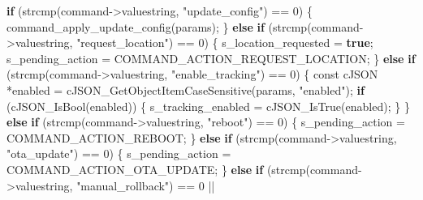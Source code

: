 \documentclass[13pt,a4paper]{extarticle}
\newenvironment{Shaded}{}{}
\newcommand{\ControlFlowTok}[1]{\textcolor[rgb]{0.00,0.44,0.13}{\textbf{#1}}}
\newcommand{\DataTypeTok}[1]{\textcolor[rgb]{0.56,0.13,0.00}{#1}}
\newcommand{\DecValTok}[1]{\textcolor[rgb]{0.25,0.63,0.44}{#1}}
\newcommand{\KeywordTok}[1]{\textcolor[rgb]{0.00,0.44,0.13}{\textbf{#1}}}
\newcommand{\NormalTok}[1]{#1}
\newcommand{\OperatorTok}[1]{\textcolor[rgb]{0.40,0.40,0.40}{#1}}
\newcommand{\StringTok}[1]{\textcolor[rgb]{0.25,0.44,0.63}{#1}}
\renewcommand{\\}{\thesislongtableorignewline\hline}%
\begin{document}
\begin{Shaded}
\begin{Highlighting}[]
    \ControlFlowTok{if} \OperatorTok{(}\NormalTok{strcmp}\OperatorTok{(}\NormalTok{command}\OperatorTok{{-}\textgreater{}}\NormalTok{valuestring}\OperatorTok{,} \StringTok{"update\_config"}\OperatorTok{)} \OperatorTok{==} \DecValTok{0}\OperatorTok{)} \OperatorTok{\{}
\NormalTok{        command\_apply\_update\_config}\OperatorTok{(}\NormalTok{params}\OperatorTok{);}
    \OperatorTok{\}} \ControlFlowTok{else} \ControlFlowTok{if} \OperatorTok{(}\NormalTok{strcmp}\OperatorTok{(}\NormalTok{command}\OperatorTok{{-}\textgreater{}}\NormalTok{valuestring}\OperatorTok{,} \StringTok{"request\_location"}\OperatorTok{)} \OperatorTok{==} \DecValTok{0}\OperatorTok{)} \OperatorTok{\{}
\NormalTok{        s\_location\_requested }\OperatorTok{=} \KeywordTok{true}\OperatorTok{;}
\NormalTok{        s\_pending\_action }\OperatorTok{=}\NormalTok{ COMMAND\_ACTION\_REQUEST\_LOCATION}\OperatorTok{;}
    \OperatorTok{\}} \ControlFlowTok{else} \ControlFlowTok{if} \OperatorTok{(}\NormalTok{strcmp}\OperatorTok{(}\NormalTok{command}\OperatorTok{{-}\textgreater{}}\NormalTok{valuestring}\OperatorTok{,} \StringTok{"enable\_tracking"}\OperatorTok{)} \OperatorTok{==} \DecValTok{0}\OperatorTok{)} \OperatorTok{\{}
        \DataTypeTok{const}\NormalTok{ cJSON }\OperatorTok{*}\NormalTok{enabled }\OperatorTok{=}\NormalTok{ cJSON\_GetObjectItemCaseSensitive}\OperatorTok{(}\NormalTok{params}\OperatorTok{,} \StringTok{"enabled"}\OperatorTok{);}
        \ControlFlowTok{if} \OperatorTok{(}\NormalTok{cJSON\_IsBool}\OperatorTok{(}\NormalTok{enabled}\OperatorTok{))} \OperatorTok{\{}
\NormalTok{            s\_tracking\_enabled }\OperatorTok{=}\NormalTok{ cJSON\_IsTrue}\OperatorTok{(}\NormalTok{enabled}\OperatorTok{);}
        \OperatorTok{\}}
    \OperatorTok{\}} \ControlFlowTok{else} \ControlFlowTok{if} \OperatorTok{(}\NormalTok{strcmp}\OperatorTok{(}\NormalTok{command}\OperatorTok{{-}\textgreater{}}\NormalTok{valuestring}\OperatorTok{,} \StringTok{"reboot"}\OperatorTok{)} \OperatorTok{==} \DecValTok{0}\OperatorTok{)} \OperatorTok{\{}
\NormalTok{        s\_pending\_action }\OperatorTok{=}\NormalTok{ COMMAND\_ACTION\_REBOOT}\OperatorTok{;}
    \OperatorTok{\}} \ControlFlowTok{else} \ControlFlowTok{if} \OperatorTok{(}\NormalTok{strcmp}\OperatorTok{(}\NormalTok{command}\OperatorTok{{-}\textgreater{}}\NormalTok{valuestring}\OperatorTok{,} \StringTok{"ota\_update"}\OperatorTok{)} \OperatorTok{==} \DecValTok{0}\OperatorTok{)} \OperatorTok{\{}
\NormalTok{        s\_pending\_action }\OperatorTok{=}\NormalTok{ COMMAND\_ACTION\_OTA\_UPDATE}\OperatorTok{;}
    \OperatorTok{\}} \ControlFlowTok{else} \ControlFlowTok{if} \OperatorTok{(}\NormalTok{strcmp}\OperatorTok{(}\NormalTok{command}\OperatorTok{{-}\textgreater{}}\NormalTok{valuestring}\OperatorTok{,} \StringTok{"manual\_rollback"}\OperatorTok{)} \OperatorTok{==} \DecValTok{0} \OperatorTok{||}

\end{Highlighting}
\end{Shaded}
\end{document}
